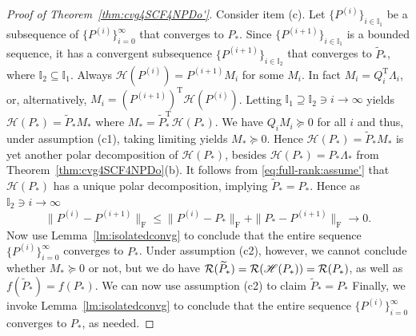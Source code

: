 \documentclass[11pt]{article}
\def\bbI{\mathbb{I}}
\def\scrH{\mathscr{H}}
\def\cR{{\cal R}}
\def\wtd{\widetilde}
\def\what{\widehat}
\DeclareMathOperator{\F}{F}
\DeclareMathOperator{\T}{T}
\def\Red{\textcolor{red}}
\theoremstyle{definition}
\numberwithin{equation}{section}
\begin{document}
\begin{proof}[Proof of Theorem~\ref{thm:cvg4SCF4NPDo'}]
Consider item (c).
Let $\{P^{(i)}\}_{i\in\bbI_1}$ be a subsequence of $\{P^{(i)}\}_{i=0}^{\infty}$ that converges to $P_*$.
Since $\{P^{(i+1)}\}_{i\in\bbI_1}$ is a bounded sequence, it has a convergent subsequence
$\{P^{(i+1)}\}_{i\in\bbI_2}$ that converges to $\wtd P_*$, where $\bbI_2\subseteq\bbI_1$.
Always $\scrH(P^{(i)})=P^{(i+1)}M_i$ for some $M_i$. In fact $M_i=Q_i^{\T}\Lambda_i$,
or, alternatively, $M_i=(P^{(i+1)})^{\T}\scrH(P^{(i)})$. Letting $\bbI_1\supseteq\bbI_2\ni i\to\infty$ yields
$\scrH(P_*)=\wtd P_*M_*$ where $M_*=\wtd P_*^{\T}\scrH(P_*)$.
We have $Q_iM_i\succeq 0$ for all $i$ and thus, under assumption (c1),  taking limiting yields $M_*\succeq 0$.
Hence $\scrH(P_*)=\wtd P_*M_*$ is yet another polar decomposition of
$\scrH(P_*)$, besides $\scrH(P_*)=P_*\Lambda_*$ from Theorem~\ref{thm:cvg4SCF4NPDo}(b).
It follows from \eqref{eq:full-rank:assume'} that $\scrH(P_*)$ has a unique polar decomposition, implying $\wtd P_*=P_*$.
Hence as $\bbI_2\ni i\to\infty$
$$
\|P^{(i)}-P^{(i+1)}\|_{\F}\le\|P^{(i)}-P_*\|_{\F}+\|P_*-P^{(i+1)}\|_{\F}\to 0.
$$
Now use Lemma~\ref{lm:isolatedconvg} to conclude that the entire sequence
$\{P^{(i)}\}_{i=0}^{\infty}$ converges to $P_*$. Under assumption (c2), however, we cannot conclude whether
$M_*\succeq 0$ or not, but we do have $\cR(\wtd P_*)=\cR(\scrH(P_*))=\cR(P_*)$, as well as
$f(\wtd P_*)=f(P_*)$. We can now use assumption (c2) to claim $\wtd P_*=P_*$
Finally, we invoke Lemma~\ref{lm:isolatedconvg} to conclude that the entire sequence
$\{P^{(i)}\}_{i=0}^{\infty}$ converges to $P_*$, as needed.
%
%
\end{proof}
\end{document}
